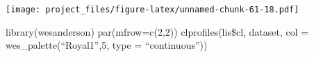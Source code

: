 \documentclass[
]{article}
\newenvironment{Shaded}{\begin{snugshade}}{\end{snugshade}}
\newcommand{\ControlFlowTok}[1]{\textcolor[rgb]{0.13,0.29,0.53}{\textbf{#1}}}
\newcommand{\DataTypeTok}[1]{\textcolor[rgb]{0.13,0.29,0.53}{#1}}
\newcommand{\DecValTok}[1]{\textcolor[rgb]{0.00,0.00,0.81}{#1}}
\newcommand{\KeywordTok}[1]{\textcolor[rgb]{0.13,0.29,0.53}{\textbf{#1}}}
\newcommand{\NormalTok}[1]{#1}
\newcommand{\OperatorTok}[1]{\textcolor[rgb]{0.81,0.36,0.00}{\textbf{#1}}}
\newcommand{\StringTok}[1]{\textcolor[rgb]{0.31,0.60,0.02}{#1}}
\begin{document}
\begin{Shaded}
\end{Shaded}

\texttt{[image: project\_files/figure-latex/unnamed-chunk-61-18.pdf]}

library(wesanderson) par(mfrow=c(2,2)) clprofiles(lis\$cl, dataset, col
= wes\_palette(``Royal1'',5, type = ``continuous''))

\begin{Shaded}
\end{Shaded}
\end{document}
